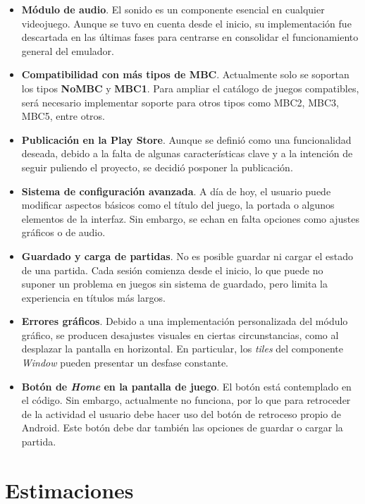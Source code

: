 \begin{itemize}
    \item \textbf{Módulo de audio}. El sonido es un componente esencial en cualquier videojuego. Aunque se tuvo en cuenta desde el inicio, su implementación fue descartada en las últimas fases para centrarse en consolidar el funcionamiento general del emulador.
    
    \item \textbf{Compatibilidad con más tipos de MBC}. Actualmente solo se soportan los tipos \textbf{NoMBC} y \textbf{MBC1}. Para ampliar el catálogo de juegos compatibles, será necesario implementar soporte para otros tipos como MBC2, MBC3, MBC5, entre otros.
    
    \item \textbf{Publicación en la Play Store}. Aunque se definió como una funcionalidad deseada, debido a la falta de algunas características clave y a la intención de seguir puliendo el proyecto, se decidió posponer la publicación.
    
    \item \textbf{Sistema de configuración avanzada}. A día de hoy, el usuario puede modificar aspectos básicos como el título del juego, la portada o algunos elementos de la interfaz. Sin embargo, se echan en falta opciones como ajustes gráficos o de audio.
    
    \item \textbf{Guardado y carga de partidas}. No es posible guardar ni cargar el estado de una partida. Cada sesión comienza desde el inicio, lo que puede no suponer un problema en juegos sin sistema de guardado, pero limita la experiencia en títulos más largos.
    
    \item \textbf{Errores gráficos}. Debido a una implementación personalizada del módulo gráfico, se producen desajustes visuales en ciertas circunstancias, como al desplazar la pantalla en horizontal. En particular, los \textit{tiles} del componente \textit{Window} pueden presentar un desfase constante.
    \item \textbf{Botón de \textit{Home} en la pantalla de juego}. El botón está contemplado en el código. Sin embargo, actualmente no funciona, por lo que para retroceder de la actividad el usuario debe hacer uso del botón de retroceso propio de Android. Este botón debe dar también las opciones de guardar o cargar la partida.
\end{itemize}

\section{Estimaciones}\label{estimaciones}

